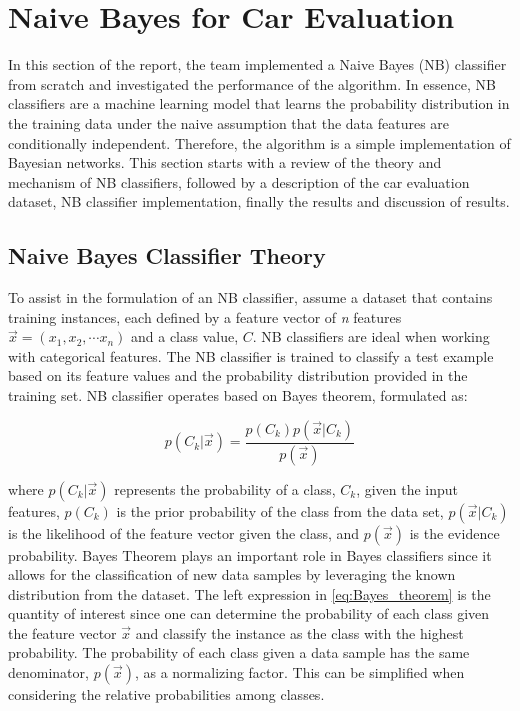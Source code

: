 \documentclass[a4paper]{article}
\begin{document}
\section{Naive Bayes for Car Evaluation}
In this section of the report, the team implemented a Naive Bayes (NB) classifier from scratch and investigated the performance of the algorithm. In essence, NB classifiers are a machine learning model that learns the probability distribution in the training data under the naive assumption that the data features are conditionally independent. Therefore, the algorithm is a simple implementation of Bayesian networks. This section starts with a review of the theory and mechanism of NB classifiers, followed by a description of the car evaluation dataset, NB classifier implementation, finally the results and discussion of results.

\subsection{Naive Bayes Classifier Theory}

To assist in the formulation of an NB classifier, assume a dataset that contains training instances, each defined by a feature vector of \textit{n} features $\vec{x}=(x_1, x_2, \cdots x_n)$ and a class value, $C$. NB classifiers are ideal when working with categorical features. The NB classifier is trained to classify a test example based on its feature values and the probability distribution provided in the training set. NB classifier operates based on Bayes theorem, formulated as:

\begin{equation} \label{eq:Bayes_theorem}
    p(C_k|\vec{x}) = \frac{p(C_k)p(\vec{x}|C_k)}{p(\vec{x})}
\end{equation}

where $p(C_k|\vec x)$ represents the probability of a class, $C_k$, given the input features, $p(C_k)$ is the prior probability of the class from the data set, $p(\vec x|C_k)$ is the likelihood of the feature vector given the class, and $p(\vec x)$ is the evidence probability. Bayes Theorem plays an important role in Bayes classifiers since it allows for the classification of new data samples by leveraging the known distribution from the dataset. The left expression in \cref{eq:Bayes_theorem} is the quantity of interest since one can determine the probability of each class given the feature vector $\vec {x}$ and classify the instance as the class with the highest probability. The probability of each class given a data sample has the same denominator, $p(\vec x)$, as a normalizing factor. This can be simplified when considering the relative probabilities among classes.
\end{document}
